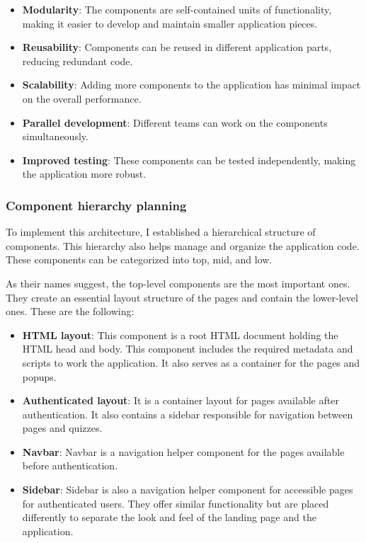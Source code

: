 \begin{itemize}
\item \textbf{Modularity}: The components are self-contained units of functionality, making it easier to develop and maintain smaller application pieces.
\item \textbf{Reusability}: Components can be reused in different application parts, reducing redundant code.
\item \textbf{Scalability}: Adding more components to the application has minimal impact on the overall performance.
\item \textbf{Parallel development}: Different teams can work on the components simultaneously.
\item \textbf{Improved testing}: These components can be tested independently, making the application more robust.
\end{itemize}

\subsubsection{Component hierarchy planning}

To implement this architecture, I established a hierarchical structure of components. This hierarchy also helps manage and organize the application code. These components can be categorized into top, mid, and low.

As their names suggest, the top-level components are the most important ones. They create an essential layout structure of the pages and contain the lower-level ones. These are the following:

\begin{itemize}
\item \textbf{HTML layout}: This component is a root HTML document holding the HTML head and body. This component includes the required metadata and scripts to work the application. It also serves as a container for the pages and popups.
\item \textbf{Authenticated layout}: It is a container layout for pages available after authentication. It also contains a sidebar responsible for navigation between pages and quizzes.
\item \textbf{Navbar}: Navbar is a navigation helper component for the pages available before authentication.
\item \textbf{Sidebar}: Sidebar is also a navigation helper component for accessible pages for authenticated users. They offer similar functionality but are placed differently to separate the look and feel of the landing page and the application.
\end{itemize}

